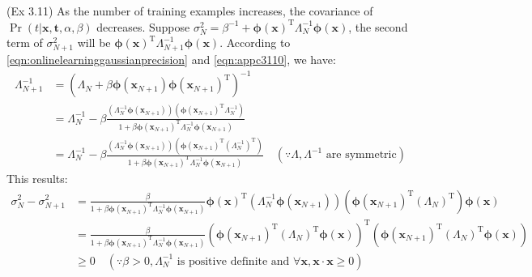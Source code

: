 (Ex 3.11) As the number of training examples increases, the covariance of $\Pr(t\vert\mathbf{x},\mathbf{t},\alpha,\beta)$ decreases. 
Suppose $\sigma_{N}^{2}=\beta^{-1}+\boldsymbol{\phi}(\mathbf{x})^{\mathrm{T}}\Lambda_{N}^{-1}\boldsymbol{\phi}(\mathbf{x})$, the second term of $\sigma_{N+1}^{2}$ will be $\boldsymbol{\phi}(\mathbf{x})^{\mathrm{T}}\Lambda_{N+1}^{-1}\boldsymbol{\phi}(\mathbf{x})$. 
According to \eqref{eqn:onlinelearninggaussianprecision} and \eqref{eqn:appc3110}, we have:
\begin{equation}
\begin{split}
\Lambda_{N+1}^{-1}&=(\Lambda_{N}+\beta\boldsymbol{\phi}(\mathbf{x}_{N+1})\boldsymbol{\phi}(\mathbf{x}_{N+1})^{\mathrm{T}})^{-1}\\
&=\Lambda_{N}^{-1}-\beta\frac{(\Lambda_{N}^{-1}\boldsymbol{\phi}(\mathbf{x}_{N+1}))(\boldsymbol{\phi}(\mathbf{x}_{N+1})^{\mathrm{T}}\Lambda_{N}^{-1})}{1+\beta\boldsymbol{\phi}(\mathbf{x}_{N+1})^{\mathrm{T}}\Lambda_{N}^{-1}\boldsymbol{\phi}(\mathbf{x}_{N+1})}\\
&=\Lambda_{N}^{-1}-\beta\frac{(\Lambda_{N}^{-1}\boldsymbol{\phi}(\mathbf{x}_{N+1}))(\boldsymbol{\phi}(\mathbf{x}_{N+1})^{\mathrm{T}}(\Lambda_{N}^{-1})^{\mathrm{T}})}{1+\beta\boldsymbol{\phi}(\mathbf{x}_{N+1})^{\mathrm{T}}\Lambda_{N}^{-1}\boldsymbol{\phi}(\mathbf{x}_{N+1})}\quad{}(\because{}\Lambda,\Lambda^{-1}\text{ are symmetric})
\end{split}
\end{equation}
This results:
\begin{equation}
\begin{split}
\sigma_{N}^{2}-\sigma_{N+1}^{2}&=\frac{\beta}{1+\beta\boldsymbol{\phi}(\mathbf{x}_{N+1})^{\mathrm{T}}\Lambda_{N}^{-1}\boldsymbol{\phi}(\mathbf{x}_{N+1})}\boldsymbol{\phi}(\mathbf{x})^{\mathrm{T}}(\Lambda_{N}^{-1}\boldsymbol{\phi}(\mathbf{x}_{N+1}))(\boldsymbol{\phi}(\mathbf{x}_{N+1})^{\mathrm{T}}(\Lambda_{N})^{\mathrm{T}})\boldsymbol{\phi}(\mathbf{x})\\
&=\frac{\beta}{1+\beta\boldsymbol{\phi}(\mathbf{x}_{N+1})^{\mathrm{T}}\Lambda_{N}^{-1}\boldsymbol{\phi}(\mathbf{x}_{N+1})}(\boldsymbol{\phi}(\mathbf{x}_{N+1})^{\mathrm{T}}(\Lambda_{N})^{\mathrm{T}}\boldsymbol{\phi}(\mathbf{x}))^{\mathrm{T}}(\boldsymbol{\phi}(\mathbf{x}_{N+1})^{\mathrm{T}}(\Lambda_{N})^{\mathrm{T}}\boldsymbol{\phi}(\mathbf{x}))\\
&\geq0\quad{}(\because\beta>0,\Lambda_{N}^{-1}\text{ is positive definite and }\forall\mathbf{x},\mathbf{x}\cdot\mathbf{x}\geq0)
\end{split}
\end{equation}
